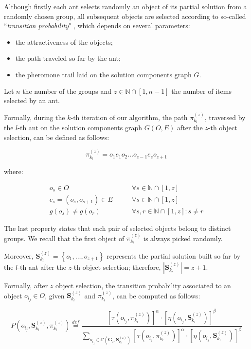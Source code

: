 \documentclass[12pt,a4paper]{report}
\newcommand{\mathDef}{\overset{\textit{def}}{=}}
\newcommand{\N}{\mathbb{N}}
\newcommand{\SetFromOneTo}[1]{\N \cap \left[1,#1\right]}
\newcommand{\ItalicQuotMark}[1]{``\textit{#1}"}
\begin{document}
Although firstly each ant selects randomly an object of its partial solution from a randomly chosen group, all subsequent objects are selected according to so-called \ItalicQuotMark{transition probability} \cite{MAXMIN}\cite{acosemplice}\cite{acostrano}, which depends on several parameters:

\begin{itemize}
	\item the attractiveness of the objects;
	\item the path traveled so far by the ant;
	\item the pheromone trail laid on the solution components graph $G$.
\end{itemize}

Let $n$ the number of the groups and $z \in \SetFromOneTo{n-1}$ the number of items selected by an ant. 

Formally, during the $k$-th iteration of our algorithm, the path $\pi_{k_l}^{(z)}$, traversed by the $l$-th ant on the solution components graph $G(O,E)$ after the $z$-th object selection, can be defined as follows:

\begin{equation}
	\pi_{k_l}^{(z)} = o_1e_1o_2 \ldots o_{z-1}e_{z}o_{z+1}
\end{equation} 

where:

\begin{eqnarray}
	o_s \in O & \qquad \forall s \in \SetFromOneTo{z} \\
	e_s = (o_s,o_{s+1}) \in E  & \qquad \forall s \in \SetFromOneTo{z} \\
	g(o_s) \neq g(o_r)   &\qquad \forall s,r \in \SetFromOneTo{z} : s \neq r
\end{eqnarray}

The last property states that each pair of selected objects belong to distinct groups. We recall that the first object of $\pi_{k_l}^{(z)}$ is always picked randomly.

Moreover, $\textbf{S}_{k_l}^{(z)} = \left\{o_1,\ldots,o_{z+1}\right\}$ represents the partial solution built so far by the $l$-th ant after the $z$-th object selection; therefore, $|\textbf{S}_{k_l}^{(z)}| = z + 1$.  

Formally, after $z$ object selection, the transition probability associated to an object $o_{i_j} \in O$, given $\textbf{S}_{k_l}^{(z)}$ and $\pi_{k_l}^{(z)}$, can be computed as follows:




\begin{equation}
	P(o_{i_j}, \textbf{S}_{k_l}^{(z)}, \pi_{k_l}^{(z)}) \mathDef \frac{\left[ \tau( o_{i_j}, \pi_{k_l}^{(z)}) \right]^{\alpha} \cdot \left[ \eta( o_{i_j}, \textbf{S}_{k_l}^{(z)}) \right]^{\beta}}{\displaystyle \sum_{o_{i_j} \in \mathcal{C}(\textbf{G}_i, \textbf{S}_{k_l}^{(z)})} \left[ \tau( o_{i_j}, \pi_{k_l}^{(z)}) \right]^{\alpha} \cdot \left[ \eta( o_{i_j}, \textbf{S}_{k_l}^{(z)}) \right]^{\beta}}
\end{equation}
\end{document}
